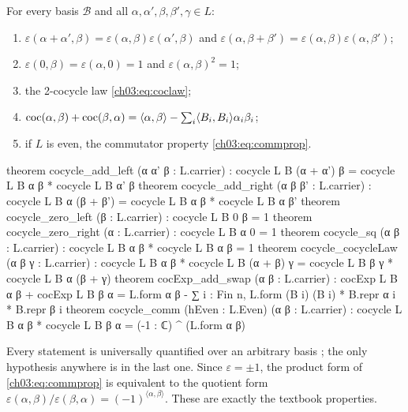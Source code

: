 \begin{theorem}\label{ch03:thm:cocycle}
For every basis $\mathcal B$ and all $\alpha,\alpha',\beta,\beta',\gamma\in L$:
\begin{enumerate}[label=(\roman*)]
\item $\varepsilon(\alpha+\alpha',\beta)=\varepsilon(\alpha,\beta)\varepsilon(\alpha',\beta)$
  and $\varepsilon(\alpha,\beta+\beta')=\varepsilon(\alpha,\beta)\varepsilon(\alpha,\beta')$;
\item $\varepsilon(0,\beta)=\varepsilon(\alpha,0)=1$ and $\varepsilon(\alpha,\beta)^2=1$;
\item the 2-cocycle law \eqref{ch03:eq:coclaw};
\item $\operatorname{coc}(\alpha,\beta)+\operatorname{coc}(\beta,\alpha)=\langle\alpha,\beta\rangle
  -\sum_i\langle B_i,B_i\rangle\alpha_i\beta_i$;
\item if $L$ is even, the commutator property \eqref{ch03:eq:commprop}.
\end{enumerate}
\end{theorem}
\begin{leancode}
theorem cocycle_add_left (α α' β : L.carrier) :
    cocycle L B (α + α') β = cocycle L B α β * cocycle L B α' β
theorem cocycle_add_right (α β β' : L.carrier) :
    cocycle L B α (β + β') = cocycle L B α β * cocycle L B α β'
theorem cocycle_zero_left (β : L.carrier) : cocycle L B 0 β = 1
theorem cocycle_zero_right (α : L.carrier) : cocycle L B α 0 = 1
theorem cocycle_sq (α β : L.carrier) : cocycle L B α β * cocycle L B α β = 1
theorem cocycle_cocycleLaw (α β γ : L.carrier) :
    cocycle L B α β * cocycle L B (α + β) γ = cocycle L B β γ * cocycle L B α (β + γ)
theorem cocExp_add_swap (α β : L.carrier) :
    cocExp L B α β + cocExp L B β α
      = L.form α β - ∑ i : Fin n, L.form (B i) (B i) * B.repr α i * B.repr β i
theorem cocycle_comm (hEven : L.Even) (α β : L.carrier) :
    cocycle L B α β * cocycle L B β α = (-1 : ℂ) ^ (L.form α β)
\end{leancode}

\begin{dictionary}
Every statement is universally quantified over an arbitrary basis ; the only hypothesis
anywhere is  in the last one. Since $\varepsilon=\pm1$, the product form of
\eqref{ch03:eq:commprop} is equivalent to the quotient form $\varepsilon(\alpha,\beta)/\varepsilon
(\beta,\alpha)=(-1)^{\langle\alpha,\beta\rangle}$. These are exactly the textbook properties.
\end{dictionary}

